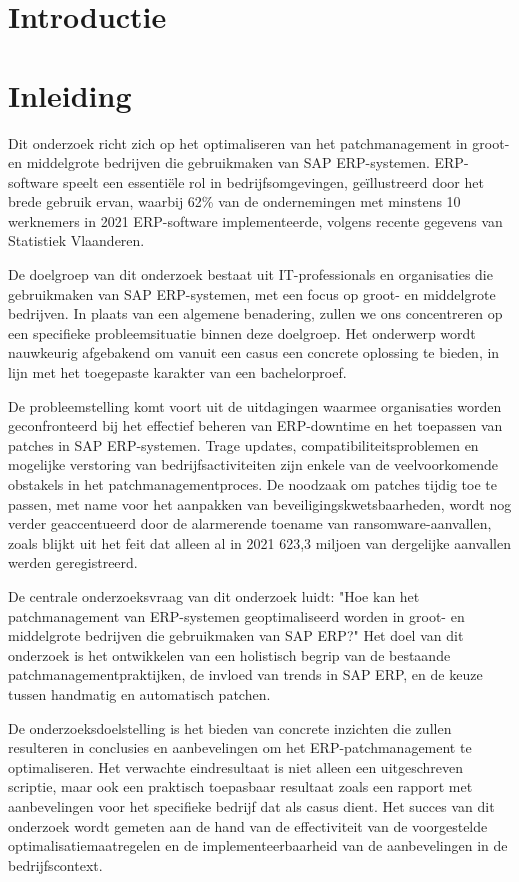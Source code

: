 
\section{Introductie}%
\label{sec:introductie}
\section{Inleiding}

Dit onderzoek richt zich op het optimaliseren van het patchmanagement in groot- en middelgrote bedrijven die gebruikmaken van SAP ERP-systemen. ERP-software speelt een essentiële rol in bedrijfsomgevingen, geïllustreerd door het brede gebruik ervan, waarbij 62\% van de ondernemingen met minstens 10 werknemers in 2021 ERP-software implementeerde, volgens recente gegevens van Statistiek Vlaanderen.

De doelgroep van dit onderzoek bestaat uit IT-professionals en organisaties die gebruikmaken van SAP ERP-systemen, met een focus op groot- en middelgrote bedrijven. In plaats van een algemene benadering, zullen we ons concentreren op een specifieke probleemsituatie binnen deze doelgroep. Het onderwerp wordt nauwkeurig afgebakend om vanuit een casus een concrete oplossing te bieden, in lijn met het toegepaste karakter van een bachelorproef.

De probleemstelling komt voort uit de uitdagingen waarmee organisaties worden geconfronteerd bij het effectief beheren van ERP-downtime en het toepassen van patches in SAP ERP-systemen. Trage updates, compatibiliteitsproblemen en mogelijke verstoring van bedrijfsactiviteiten zijn enkele van de veelvoorkomende obstakels in het patchmanagementproces. De noodzaak om patches tijdig toe te passen, met name voor het aanpakken van beveiligingskwetsbaarheden, wordt nog verder geaccentueerd door de alarmerende toename van ransomware-aanvallen, zoals blijkt uit het feit dat alleen al in 2021 623,3 miljoen van dergelijke aanvallen werden geregistreerd.

De centrale onderzoeksvraag van dit onderzoek luidt: "Hoe kan het patchmanagement van ERP-systemen geoptimaliseerd worden in groot- en middelgrote bedrijven die gebruikmaken van SAP ERP?" Het doel van dit onderzoek is het ontwikkelen van een holistisch begrip van de bestaande patchmanagementpraktijken, de invloed van trends in SAP ERP, en de keuze tussen handmatig en automatisch patchen. 

De onderzoeksdoelstelling is het bieden van concrete inzichten die zullen resulteren in conclusies en aanbevelingen om het ERP-patchmanagement te optimaliseren. Het verwachte eindresultaat is niet alleen een uitgeschreven scriptie, maar ook een praktisch toepasbaar resultaat zoals een rapport met aanbevelingen voor het specifieke bedrijf dat als casus dient. Het succes van dit onderzoek wordt gemeten aan de hand van de effectiviteit van de voorgestelde optimalisatiemaatregelen en de implementeerbaarheid van de aanbevelingen in de bedrijfscontext.

